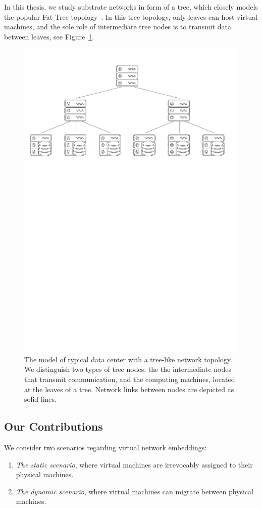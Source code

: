 In this thesis, we study substrate networks in form of a tree, which closely models the popular Fat-Tree topology~\cite{fat-trees}.
In this tree topology, only leaves can host virtual machines, and the sole role of intermediate tree nodes is to transmit data between leaves, see Figure~\ref{fig:tree-topology}.


\begin{figure}[t]
\centering
\includegraphics[width=0.79\columnwidth]{figs/tree-topology.pdf}
\caption{The model of typical data center with a tree-like network topology. We distinguish two types of tree nodes: the the intermediate nodes that transmit communication, and the computing machines, located at the leaves of a tree. Network links between nodes are depicted as solid lines.}\label{fig:tree-topology}
\vspace{-1em}
\end{figure}


\subsection{Our Contributions}

We consider two scenarios regarding virtual network embeddings:
\begin{enumerate}
  \item \emph{The static scenario}, where virtual machines are irrevocably assigned to their physical machines.
  \item \emph{The dynamic scenario}, where virtual machines can migrate between physical machines.
\end{enumerate}

